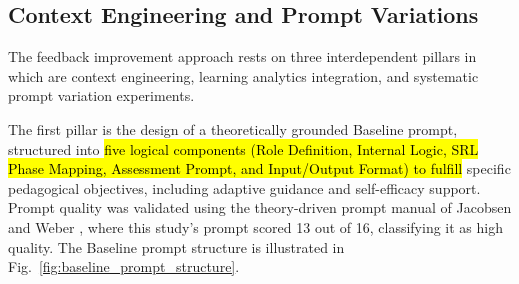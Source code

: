 \documentclass[conference,a4paper]{IEEEtran}
\begin{document}

%
%
%
%


\subsection{Context Engineering and Prompt Variations}
\label{sec:method}

The feedback improvement approach rests on three 
interdependent pillars in which are context engineering, 
learning analytics integration, and systematic 
prompt variation experiments.

The first pillar is the design of a theoretically 
grounded Baseline prompt, structured into 
\hl{five logical components (Role Definition, Internal 
Logic, SRL Phase Mapping, Assessment Prompt, and 
Input/Output Format) to fulfill} specific pedagogical 
objectives, including adaptive guidance and 
self-efficacy support. Prompt quality was validated 
using the theory-driven prompt manual of Jacobsen 
and Weber \cite{jacobsen2025promises}, where this 
study's prompt scored 13 out of 16, classifying it 
as high quality. The Baseline prompt structure is 
illustrated in Fig.~\ref{fig:baseline_prompt_structure}.
\end{document}

